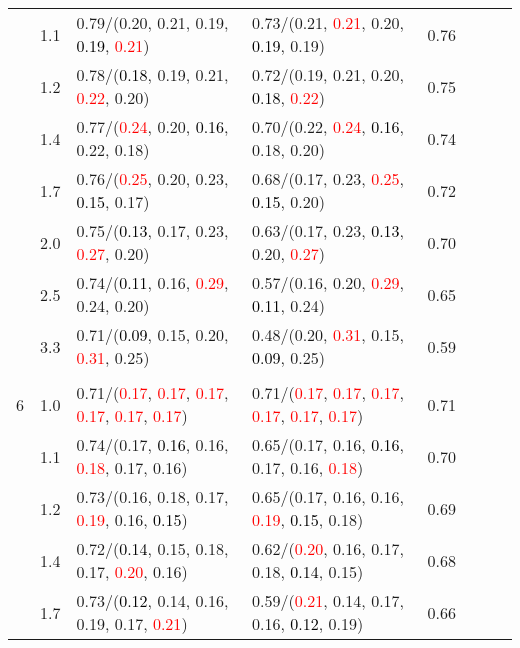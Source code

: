 \documentclass[10pt,a4paper]{report}
\begin{document}
\begin{table}[!htbp]
\begin{center}
{\begin{tabular}{ccllcccc}
			&1.1&0.79/(0.20, 0.21, 0.19, \textcolor{black}{0.19}, \textcolor{red}{0.21})&0.73/(0.21, \textcolor{red}{0.21}, 0.20, \textcolor{black}{0.19}, 0.19)&0.76\\
			&1.2&0.78/(\textcolor{black}{0.18}, 0.19, 0.21, \textcolor{red}{0.22}, 0.20)&0.72/(0.19, 0.21, 0.20, \textcolor{black}{0.18}, \textcolor{red}{0.22})&0.75\\
			&1.4&0.77/(\textcolor{red}{0.24}, 0.20, \textcolor{black}{0.16}, 0.22, 0.18)&0.70/(0.22, \textcolor{red}{0.24}, \textcolor{black}{0.16}, 0.18, 0.20)&0.74\\
			&1.7&0.76/(\textcolor{red}{0.25}, 0.20, 0.23, \textcolor{black}{0.15}, 0.17)&0.68/(0.17, 0.23, \textcolor{red}{0.25}, \textcolor{black}{0.15}, 0.20)&0.72\\
			&2.0&0.75/(\textcolor{black}{0.13}, 0.17, 0.23, \textcolor{red}{0.27}, 0.20)&0.63/(0.17, 0.23, \textcolor{black}{0.13}, 0.20, \textcolor{red}{0.27})&0.70\\
			&2.5&0.74/(\textcolor{black}{0.11}, 0.16, \textcolor{red}{0.29}, 0.24, 0.20)&0.57/(0.16, 0.20, \textcolor{red}{0.29}, \textcolor{black}{0.11}, 0.24)&0.65\\
			&3.3&0.71/(\textcolor{black}{0.09}, 0.15, 0.20, \textcolor{red}{0.31}, 0.25)&0.48/(0.20, \textcolor{red}{0.31}, 0.15, \textcolor{black}{0.09}, 0.25)&0.59\\
			&&&&\\
			6			&1.0&0.71/(\textcolor{red}{0.17}, \textcolor{red}{0.17}, \textcolor{red}{0.17}, \textcolor{red}{0.17}, \textcolor{red}{0.17}, \textcolor{red}{0.17})&0.71/(\textcolor{red}{0.17}, \textcolor{red}{0.17}, \textcolor{red}{0.17}, \textcolor{red}{0.17}, \textcolor{red}{0.17}, \textcolor{red}{0.17})&0.71\\
			&1.1&0.74/(0.17, \textcolor{black}{0.16}, 0.16, \textcolor{red}{0.18}, 0.17, 0.16)&0.65/(0.17, 0.16, \textcolor{black}{0.16}, 0.17, 0.16, \textcolor{red}{0.18})&0.70\\
			&1.2&0.73/(0.16, 0.18, 0.17, \textcolor{red}{0.19}, 0.16, \textcolor{black}{0.15})&0.65/(0.17, 0.16, 0.16, \textcolor{red}{0.19}, \textcolor{black}{0.15}, 0.18)&0.69\\
			&1.4&0.72/(\textcolor{black}{0.14}, 0.15, 0.18, 0.17, \textcolor{red}{0.20}, 0.16)&0.62/(\textcolor{red}{0.20}, 0.16, 0.17, 0.18, \textcolor{black}{0.14}, 0.15)&0.68\\
			&1.7&0.73/(\textcolor{black}{0.12}, 0.14, 0.16, 0.19, 0.17, \textcolor{red}{0.21})&0.59/(\textcolor{red}{0.21}, 0.14, 0.17, 0.16, \textcolor{black}{0.12}, 0.19)&0.66\\

\end{tabular}}
\end{center}
\end{table}
\end{document}
